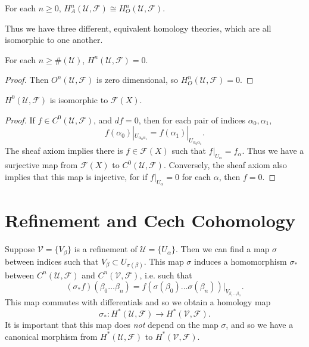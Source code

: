 \begin{lemma}
    For each $n \geq 0$, $H^n_A(\mathcal{U},\mathcal{F}) \cong H^n_O(\mathcal{U},\mathcal{F})$.
\end{lemma}

Thus we have three different, equivalent homology theories, which are all isomorphic to one another.

\begin{corollary}
    For each $n \geq \#(\mathcal{U})$, $H^n(\mathcal{U},\mathcal{F}) = 0$.
\end{corollary}
\begin{proof}
    Then $O^n(\mathcal{U},\mathcal{F})$ is zero dimensional, so $H^n_O(\mathcal{U},\mathcal{F}) = 0$.
\end{proof}

\begin{theorem}
    $H^0(\mathcal{U},\mathcal{F})$ is isomorphic to $\mathcal{F}(X)$.
\end{theorem}
\begin{proof}
    If $f \in C^0(\mathcal{U},\mathcal{F})$, and $df = 0$, then for each pair of indices $\alpha_0,\alpha_1$,
    \[ f(\alpha_0)|_{U_{\alpha_0 \alpha_1}} = f(\alpha_1)|_{U_{\alpha_0 \alpha_1}}. \]
    The sheaf axiom implies there is $f \in \mathcal{F}(X)$ such that $f|_{U_\alpha} = f_\alpha$. Thus we have a surjective map from $\mathcal{F}(X)$ to $C^0(\mathcal{U},\mathcal{F})$. Conversely, the sheaf axiom also implies that this map is injective, for if $f|_{U_\alpha} = 0$ for each $\alpha$, then $f = 0$.
\end{proof}

\section{Refinement and Cech Cohomology}

Suppose $\mathcal{V} = \{ V_\beta \}$ is a refinement of $\mathcal{U} = \{ U_\alpha \}$. Then we can find a map $\sigma$ between indices such that $V_\beta \subset U_{\sigma(\beta)}$. This map $\sigma$ induces a homomorphism $\sigma_*$ between $C^n(\mathcal{U},\mathcal{F})$ and $C^n(\mathcal{V},\mathcal{F})$, i.e. such that
%
\[ (\sigma_*f)(\beta_0 \dots \beta_n) = f(\sigma(\beta_0) \dots \sigma(\beta_n))|_{V_{\beta_1 \dots \beta_n}}. \]
%
This map commutes with differentials and so we obtain a homology map
%
\[ \sigma_*: H^*(\mathcal{U},\mathcal{F}) \to H^*(\mathcal{V},\mathcal{F}). \]
%
It is important that this map does \emph{not} depend on the map $\sigma$, and so we have a canonical morphism from $H^*(\mathcal{U},\mathcal{F})$ to $H^*(\mathcal{V},\mathcal{F})$.

